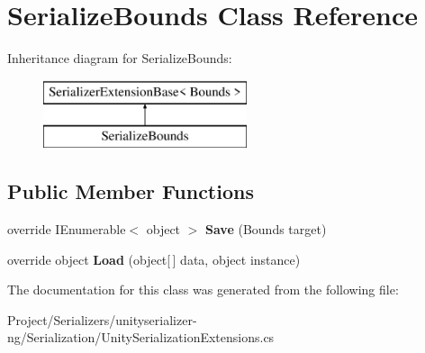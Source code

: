\hypertarget{class_serialize_bounds}{}\section{Serialize\+Bounds Class Reference}
\label{class_serialize_bounds}
Inheritance diagram for Serialize\+Bounds\+:\begin{figure}[H]
\begin{center}
\leavevmode
\includegraphics[height=2.000000cm]{class_serialize_bounds}
\end{center}
\end{figure}
\subsection*{Public Member Functions}
\begin{DoxyCompactItemize}
\item 
\mbox{\label{class_serialize_bounds_a1bb554ee48efe17ae70c846ff86cbc13}} 
override I\+Enumerable$<$ object $>$ {\bfseries Save} (Bounds target)
\item 
\mbox{\label{class_serialize_bounds_acd4e2b5a17a744395609c58cbfacd9a2}} 
override object {\bfseries Load} (object\mbox{[}$\,$\mbox{]} data, object instance)
\end{DoxyCompactItemize}


The documentation for this class was generated from the following file\+:\begin{DoxyCompactItemize}
\item 
Project/\+Serializers/unityserializer-\/ng/\+Serialization/Unity\+Serialization\+Extensions.\+cs\end{DoxyCompactItemize}
